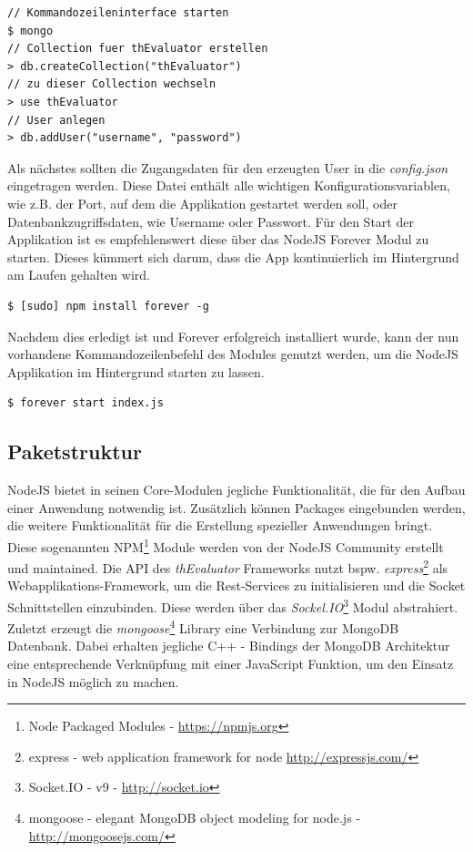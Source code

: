 \vspace{1cm}
\begin{lstlisting}[caption=Einrichten der Mongo Datenbank Datenbank,label=initMongo]
// Kommandozeileninterface starten
$ mongo
// Collection fuer thEvaluator erstellen
> db.createCollection("thEvaluator")
// zu dieser Collection wechseln
> use thEvaluator
// User anlegen
> db.addUser("username", "password")
\end{lstlisting}
\vspace{1cm}

Als nächstes sollten die Zugangsdaten für den erzeugten User in die \textit{config.json} eingetragen werden. Diese Datei enthält alle wichtigen Konfigurationsvariablen, wie z.B. der Port, auf dem die Applikation gestartet werden soll, oder Datenbankzugriffsdaten, wie Username oder Passwort. Für den Start der Applikation ist es empfehlenswert diese über das NodeJS Forever Modul zu starten. Dieses kümmert sich darum, dass die App kontinuierlich im Hintergrund am Laufen gehalten wird.

\vspace{1cm}
\begin{lstlisting}[caption=Installation von Forever auf dem Server,label=forever]
$ [sudo] npm install forever -g
\end{lstlisting}
\vspace{1cm}

Nachdem dies erledigt ist und Forever erfolgreich installiert wurde, kann der nun vorhandene Kommandozeilenbefehl des Modules genutzt werden, um die NodeJS Applikation im Hintergrund starten zu lassen.

\vspace{1cm}
\begin{lstlisting}[caption=Starten des API Services über den Forever-Befehl,label=forever]
$ forever start index.js
\end{lstlisting}

\subsection{Paketstruktur}

NodeJS bietet in seinen Core-Modulen jegliche Funktionalität, die für den Aufbau einer Anwendung notwendig ist. Zusätzlich können Packages eingebunden werden, die weitere Funktionalität für die Erstellung spezieller Anwendungen bringt. Diese sogenannten NPM\footnote{Node Packaged Modules - \url{https://npmjs.org}} Module werden von der NodeJS Community erstellt und maintained. Die API des \textit{thEvaluator} Frameworks nutzt bspw. \textit{express}\footnote{express - web application framework for node \url{http://expressjs.com/}} als Webapplikations-Framework, um die Rest-Services zu initialisieren und die Socket Schnittstellen einzubinden. Diese werden über das \textit{Sockel.IO}\footnote{Socket.IO - v9 - \url{http://socket.io}} Modul abstrahiert. Zuletzt erzeugt die \textit{mongoose}\footnote{mongoose - elegant MongoDB object modeling for node.js - \url{http://mongoosejs.com/}} Library eine Verbindung zur MongoDB Datenbank. Dabei erhalten jegliche C++ - Bindings der MongoDB Architektur eine entsprechende Verknüpfung mit einer JavaScript Funktion, um den Einsatz in NodeJS möglich zu machen.

